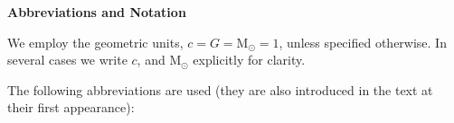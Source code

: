 \documentclass[
openright,
12pt, %
english,%
onehalfspacing, %
nolistspacing, %
nohyperref, %
headsepline, %
]{MastersDoctoralThesis} %
\def\Msun{{\text{M}_{\odot}}}
\begin{document}
\tableofcontents %




\newpage
\begin{Huge}
    \textbf{Abbreviations and Notation}
\end{Huge}

\vspace{1.5cm}

We employ the geometric units, $c = G = \Msun = 1$, unless specified otherwise. 
In several cases we write $c$, and $\Msun$ explicitly for clarity. 

The following abbreviations are used (they are also introduced in the text 
at their first appearance):


%    


%    
%    
%    
\end{document}
